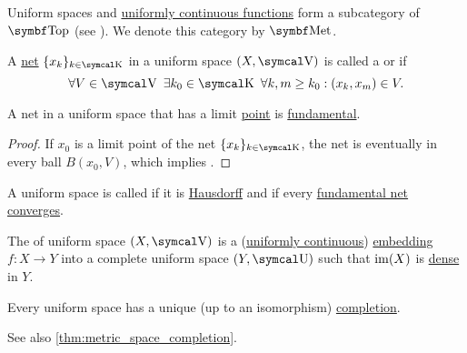 \begin{Definition}\label{def:category_of_uniform_spaces}
  Uniform spaces and \hyperref[def:uniform_continuity]{uniformly continuous functions} form a subcategory of \( \Cat{Top} \) (see ). We denote this category by \( \Cat{Met} \).
\end{Definition}

\begin{Definition}\label{def:fundamental_net}
  A \hyperref[def:topological_net]{net} \( \{ x_k \}_{k \in \CK} \) in a uniform space \( (X, \CV) \) is called a  or  if
  \begin{equation*}
    \forall V \in \CV \ \exists k_0 \in \CK \ \forall k, m \geq k_0 : (x_k, x_m) \in V.
  \end{equation*}
\end{Definition}

\begin{Lemma}\label{thm:convergent_net_is_fundamental}
  A net in a uniform space that has a limit \hyperref[def:net_convergence/limit]{point} is \hyperref[def:fundamental_net]{fundamental}.
\end{Lemma}
\begin{proof}
  If \( x_0 \) is a limit point of the net \( \{ x_k \}_{k \in \CK} \), the net is eventually in every ball \( B(x_0, V) \), which implies .
\end{proof}

\begin{Definition}\label{def:complete_uniform_space}\cite[446]{Engelking1989}
  A uniform space is called  if it is \hyperref[def:separation_axioms/T2]{Hausdorff} and if every \hyperref[def:fundamental_net]{fundamental net} \hyperref[def:net_convergence/limit]{converges}.

  The  of uniform space \( (X, \CV) \) is a (\hyperref[def:uniform_continuity]{uniformly continuous}) \hyperref[def:morphism_invertibility/monomorphism]{embedding} \( f: X \to Y \) into a complete uniform space \( (Y, \CU) \) such that \( \operatorname{im}(X) \) is \hyperref[def:topologically_dense_set/dense]{dense} in \( Y \).
\end{Definition}

\begin{Theorem}\label{thm:uniform_space_completion}\cite[theorem 8.3.12]{Engelking1989}
  Every uniform space has a unique (up to an isomorphism) \hyperref[def:complete_uniform_space]{completion}.

  See also \cref{thm:metric_space_completion}.
\end{Theorem}

